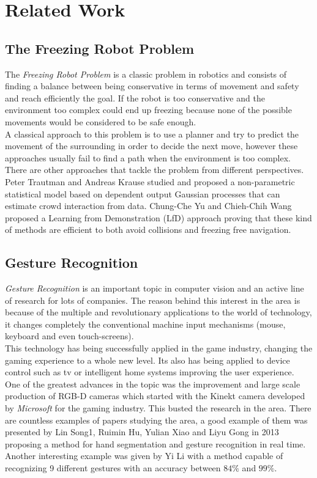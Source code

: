 \section{Related Work}
\label{sec:re_work}

\subsection{The Freezing Robot Problem}
The \emph{Freezing Robot Problem} is a classic problem in robotics and consists of finding a balance between being conservative in terms of movement and safety and reach efficiently the goal. If the robot is too conservative and the environment too complex could end up freezing because none of the possible movements would be considered to be safe enough. \\

A classical approach to this problem is to use a planner and try to predict the movement of the surrounding in order to decide the next move, however these approaches usually fail to find a path when the environment is too complex. There are other approaches that tackle the problem from different perspectives. Peter Trautman and Andreas Krause \cite{conf/iros/TrautmanK10} studied and proposed a non-parametric statistical model based on dependent output Gaussian processes that can estimate crowd interaction from data. Chung-Che Yu and Chieh-Chih Wang \cite{6395022} proposed a Learning from Demonstration (LfD) approach proving that these kind of methods are efficient to both avoid collisions and freezing free navigation.

\subsection{Gesture Recognition}
\emph{Gesture Recognition} is an important topic in computer vision and an active line of research for lots of companies. The reason behind this interest in the area is because of the multiple and revolutionary applications to the world of technology, it changes completely the conventional machine input mechanisms (mouse, keyboard and even touch-screens).\\

This technology has being successfully applied in the game industry, changing the gaming experience to a whole new level. Its also has being applied to device control such as tv or intelligent home systems improving the user experience.\\

One of the greatest advances in the topic was the improvement and large scale production of RGB-D cameras which started with the Kinekt camera developed by \emph{Microsoft} for the gaming industry. This busted the research in the area. There are countless examples of papers studying the area, a good example of them was presented by Lin Song1, Ruimin Hu, Yulian Xiao and Liyu Gong \cite{LinSong} in 2013 proposing a method for hand segmentation and gesture recognition in real time. Another interesting example was given by Yi Li \cite{6269439} with a method capable of recognizing 9 different gestures with an accuracy between $84\%$ and $99\%$. 
